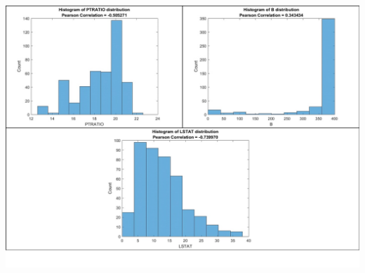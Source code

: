 \documentclass[12pt]{article}
\begin{document}
\includegraphics[width=\textwidth]{Hist3.jpg}
\end{document}
